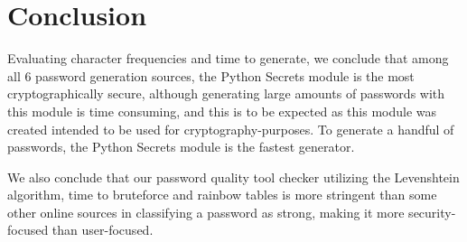 \documentclass[letterpaper,twocolumn,10pt]{article}
\begin{document}
\section{Conclusion}
Evaluating character frequencies and time to generate, we conclude that among all 6 password generation sources, the Python Secrets module is the most cryptographically secure, although generating large amounts of passwords with this module is time consuming, and this is to be expected as this module was created intended to be used for cryptography-purposes. To generate a handful of passwords, the Python Secrets module is the fastest generator. 

We also conclude that our password quality tool checker utilizing the Levenshtein algorithm, time to bruteforce and rainbow tables is more stringent than some other online sources in classifying a password as strong, making it more security-focused than user-focused.




\def\UrlBreaks{\do\/\do-}

\end{document}
